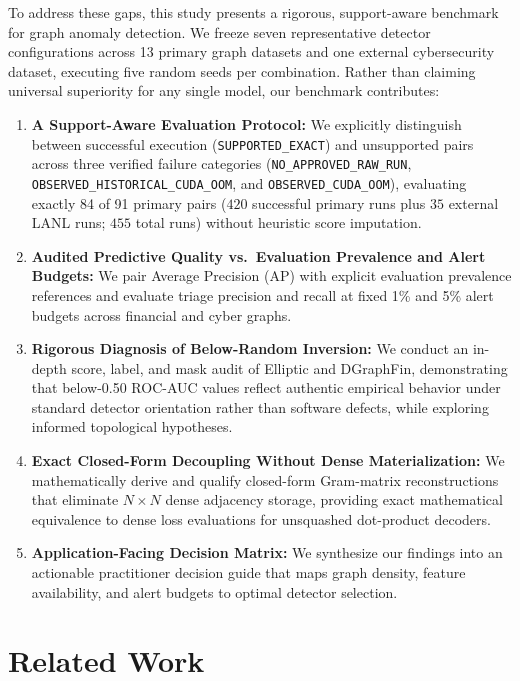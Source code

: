 \documentclass[11pt,a4paper]{article}
\begin{document}
To address these gaps, this study presents a rigorous, support-aware benchmark for graph anomaly detection. We freeze seven representative detector configurations across 13 primary graph datasets and one external cybersecurity dataset, executing five random seeds per combination. Rather than claiming universal superiority for any single model, our benchmark contributes:
\begin{enumerate}
    \item \textbf{A Support-Aware Evaluation Protocol:} We explicitly distinguish between successful execution (\texttt{SUPPORTED\_EXACT}) and unsupported pairs across three verified failure categories (\texttt{NO\_APPROVED\_RAW\_RUN}, \texttt{OBSERVED\_HISTORICAL\_CUDA\_OOM}, and \texttt{OBSERVED\_CUDA\_OOM}), evaluating exactly 84 of 91 primary pairs ($420$ successful primary runs plus $35$ external LANL runs; $455$ total runs) without heuristic score imputation.
    \item \textbf{Audited Predictive Quality vs.\ Evaluation Prevalence and Alert Budgets:} We pair Average Precision (AP) with explicit evaluation prevalence references and evaluate triage precision and recall at fixed 1\% and 5\% alert budgets across financial and cyber graphs.
    \item \textbf{Rigorous Diagnosis of Below-Random Inversion:} We conduct an in-depth score, label, and mask audit of Elliptic and DGraphFin, demonstrating that below-0.50 ROC-AUC values reflect authentic empirical behavior under standard detector orientation rather than software defects, while exploring informed topological hypotheses.
    \item \textbf{Exact Closed-Form Decoupling Without Dense Materialization:} We mathematically derive and qualify closed-form Gram-matrix reconstructions that eliminate $N \times N$ dense adjacency storage, providing exact mathematical equivalence to dense loss evaluations for unsquashed dot-product decoders.
    \item \textbf{Application-Facing Decision Matrix:} We synthesize our findings into an actionable practitioner decision guide that maps graph density, feature availability, and alert budgets to optimal detector selection.
\end{enumerate}

\section{Related Work}
\label{sec:related}
\end{document}
